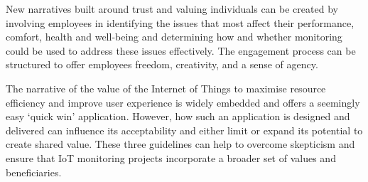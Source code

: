 New narratives built around trust and valuing individuals can be
created by involving employees in identifying the issues that most
affect their performance, comfort, health and well-being and
determining how and whether monitoring could be used to address these
issues effectively. The engagement process can be structured to offer
employees freedom, creativity, and a sense of agency. 

The narrative of the value of the Internet of Things to maximise
resource efficiency and improve user experience is widely embedded and
offers a seemingly easy ‘quick win’ application. However, how such an
application is designed and delivered can influence its acceptability
and either limit or expand its potential to create shared value. These
three guidelines can help to overcome skepticism and ensure that IoT
monitoring projects incorporate a broader set of values and
beneficiaries. 


